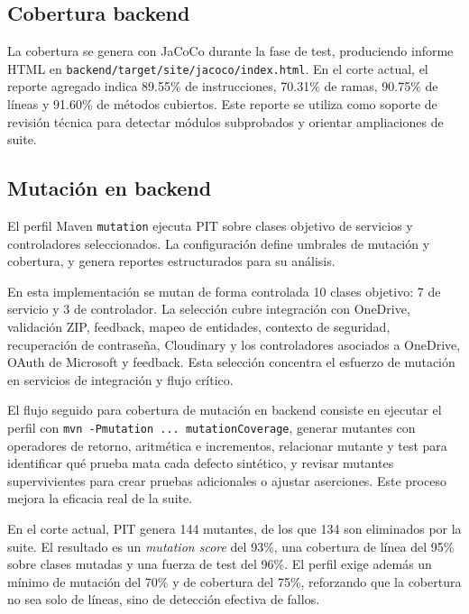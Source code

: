 \subsection{Cobertura backend}

La cobertura se genera con JaCoCo durante la fase de test,
produciendo informe HTML en
\texttt{backend/target/site/jacoco/index.html}.
En el corte actual, el reporte agregado indica 89.55\% de instrucciones, 70.31\% de ramas, 90.75\% de l\'ineas y 91.60\% de m\'etodos cubiertos. Este reporte se utiliza como soporte de revisi\'on t\'ecnica para detectar m\'odulos subprobados y orientar ampliaciones de suite.

\subsection{Mutaci\'on en backend}

El perfil Maven \texttt{mutation} ejecuta PIT sobre clases objetivo
de servicios y controladores seleccionados.
La configuraci\'on define umbrales de mutaci\'on y cobertura,
y genera reportes estructurados para su an\'alisis.

En esta implementaci\'on se mutan de forma controlada 10 clases objetivo:
7 de servicio y 3 de controlador. La selecci\'on cubre integraci\'on con
OneDrive, validaci\'on ZIP, feedback, mapeo de entidades, contexto de
seguridad, recuperaci\'on de contrase\~na, Cloudinary y los controladores
asociados a OneDrive, OAuth de Microsoft y feedback. Esta selecci\'on
concentra el esfuerzo de mutaci\'on en servicios de integraci\'on y flujo
cr\'itico.

El flujo seguido para cobertura de mutaci\'on en backend consiste en ejecutar el perfil con \texttt{mvn -Pmutation ... mutationCoverage}, generar mutantes con operadores de retorno, aritm\'etica e incrementos, relacionar mutante y test para identificar qu\'e prueba mata cada defecto sint\'etico, y revisar mutantes supervivientes para crear pruebas adicionales o ajustar aserciones. Este proceso mejora la eficacia real de la suite.

En el corte actual, PIT genera 144 mutantes, de los que 134 son eliminados por la suite. El resultado es un \textit{mutation score} del 93\%, una cobertura de l\'inea del 95\% sobre clases mutadas y una fuerza de test del 96\%. El perfil exige adem\'as un m\'inimo de mutaci\'on del 70\% y de cobertura del 75\%, reforzando que la cobertura no sea solo de l\'ineas, sino de detecci\'on efectiva de fallos.

\FloatBarrier

